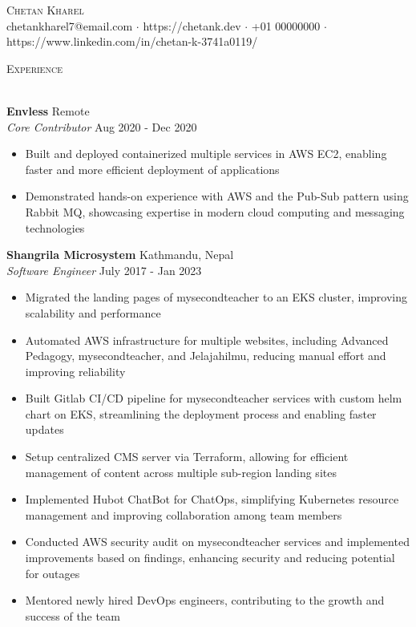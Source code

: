 \documentclass[a4paper]{article}
\newcommand{\lineunder} {
    \vspace*{-8pt} \\
    \hspace*{-18pt} \hrulefill \\
}
\newcommand{\header} [1] {
    {\hspace*{-18pt}\vspace*{6pt} \textsc{#1}}
    \vspace*{-6pt} \lineunder
}
\begin{document}
\vspace*{-40pt}

    

\vspace*{-10pt}
\begin{center}
	{\Huge \scshape {Chetan Kharel}}\\
	chetankharel7@email.com $\cdot$ https://chetank.dev $\cdot$ +01 00000000 $\cdot$ https://www.linkedin.com/in/chetan-k-3741a0119/\\
\end{center}


\header{Experience}
\vspace{1mm}

\textbf{Envless} \hfill Remote\\
\textit{Core Contributor} \hfill Aug 2020 - Dec 2020\\
\vspace{-1mm}
\begin{itemize} \itemsep 1pt
	\item Built and deployed containerized multiple services in AWS EC2, enabling faster and more efficient deployment of applications
	\item Demonstrated hands-on experience with AWS and the Pub-Sub pattern using Rabbit MQ, showcasing expertise in modern cloud computing and messaging technologies
\end{itemize}

\textbf{Shangrila Microsystem} \hfill Kathmandu, Nepal\\
\textit{Software Engineer} \hfill July 2017 - Jan 2023\\
\vspace{-1mm}
\begin{itemize} \itemsep 1pt
	\item Migrated the landing pages of mysecondteacher to an EKS cluster, improving scalability and performance
	\item Automated AWS infrastructure for multiple websites, including Advanced Pedagogy, mysecondteacher, and Jelajahilmu, reducing manual effort and improving reliability
	\item Built Gitlab CI/CD pipeline for mysecondteacher services with custom helm chart on EKS, streamlining the deployment process and enabling faster updates
	\item Setup centralized CMS server via Terraform, allowing for efficient management of content across multiple sub-region landing sites
	\item Implemented Hubot ChatBot for ChatOps, simplifying Kubernetes resource management and improving collaboration among team members
	\item Conducted AWS security audit on mysecondteacher services and implemented improvements based on findings, enhancing security and reducing potential for outages
	\item Mentored newly hired DevOps engineers, contributing to the growth and success of the team
\end{itemize}
\end{document}

